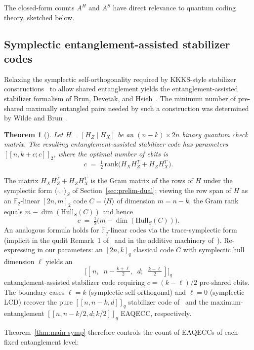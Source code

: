 \documentclass[11pt]{article}
\theoremstyle{plain}
\newtheorem{theorem}{Theorem}
\theoremstyle{remark}
\newcommand{\F}{\mathbb{F}}
\begin{document}
The closed-form counts $A^H$ and $A^S$ have direct relevance to quantum
coding theory, sketched below.

\subsection{Symplectic entanglement-assisted stabilizer codes}

Relaxing the symplectic self-orthogonality required by KKKS-style
stabilizer constructions~\cite{KKKS2006} to allow shared entanglement
yields the entanglement-assisted stabilizer formalism of Brun, Devetak,
and Hsieh~\cite{BDH2006}. The minimum number of pre-shared maximally
entangled pairs needed by such a construction was determined by Wilde
and Brun~\cite[Theorem~1]{WildeBrun2008}.

\begin{theorem}[{\cite[Theorem~1]{WildeBrun2008}}]\label{thm:WB}
Let $H = [H_Z \mid H_X]$ be an $(n - k) \times 2n$ binary quantum check
matrix. The resulting entanglement-assisted stabilizer code has parameters
$[[n, k + c; c]]_2$, where the optimal number of ebits is
\[
   c \;=\; \tfrac{1}{2}\,\mathrm{rank}\bigl(H_X H_Z^T + H_Z H_X^T\bigr).
\]
\end{theorem}

The matrix $H_X H_Z^T + H_Z H_X^T$ is the Gram matrix of the rows of $H$
under the symplectic form $\langle\cdot,\cdot\rangle_S$ of
Section~\ref{sec:prelim-dual}; viewing the row span of $H$ as an
$\F_2$-linear $[2n, m]_2$ code $C = \langle H\rangle$ of dimension
$m = n - k$, the Gram rank equals $m - \dim(\mathrm{Hull}_S(C))$ and
hence
\[
   c \;=\; \tfrac{1}{2}\bigl(m - \dim(\mathrm{Hull}_S(C))\bigr).
\]
An analogous formula holds for $\F_q$-linear codes via the
trace-symplectic form (implicit in the qudit Remark~1
of~\cite{WildeBrun2008} and in the additive machinery
of~\cite{KKKS2006}). Re-expressing in our parameters: an
$[2n, k]_q$ classical code $C$ with symplectic hull dimension $\ell$
yields an
\[
   \bigl[[\,n,\;\;n - \tfrac{k+\ell}{2},\;\; d;\;\; \tfrac{k - \ell}{2}\,]\bigr]_q
\]
entanglement-assisted stabilizer code requiring $c = (k - \ell)/2$
pre-shared ebits. The boundary cases $\ell = k$ (symplectic self-orthogonal)
and $\ell = 0$ (symplectic LCD) recover the pure $[[n, n-k, d]]_q$
stabilizer code of~\cite[Theorem~13]{KKKS2006} and the maximum-entanglement
$[[n, n - k/2, d; k/2]]_q$ EAQECC, respectively.

Theorem~\ref{thm:main-symp} therefore controls the count of EAQECCs of
each fixed entanglement level:
\end{document}
